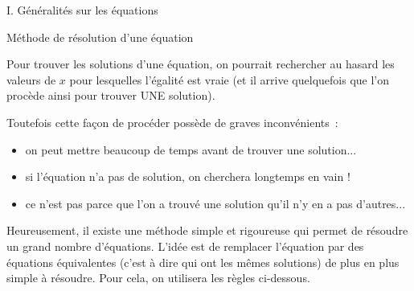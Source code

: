
\begin{h2}I. Généralités sur les équations\end{h2}


\begin{h3}Méthode de résolution d'une équation \end{h3}
Pour trouver les solutions d'une équation, on pourrait rechercher  \og au hasard \fg{} les valeurs de $x$ pour lesquelles l'égalité est vraie (et il arrive quelquefois que l'on procède ainsi pour trouver UNE solution).
\par
Toutefois cette façon de procéder possède de graves inconvénients~:

\begin{itemize}
\item
on peut mettre beaucoup de temps avant de trouver une solution...

\item
si l'équation n'a pas de solution, on cherchera longtemps en vain !

\item
ce n'est pas parce que l'on a trouvé une solution qu'il n'y en a pas d'autres...

\end{itemize}
Heureusement, il existe une méthode simple et rigoureuse qui permet de résoudre un grand nombre d'équations. L'idée est de remplacer l'équation par des équations équivalentes (c'est à dire qui ont les mêmes solutions) de plus en plus simple à résoudre. Pour cela, on utilisera les règles ci-dessous.

